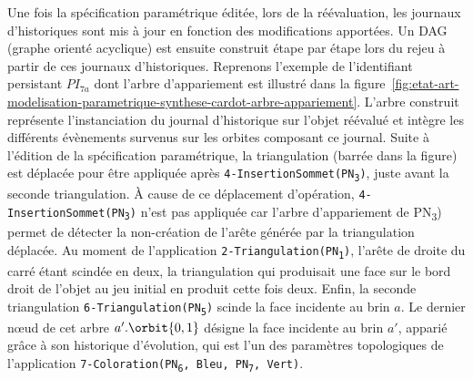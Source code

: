Une fois la spécification paramétrique éditée, lors de la réévaluation, les journaux d'historiques sont mis à jour en fonction des modifications apportées. Un DAG
(graphe orienté acyclique) est ensuite construit étape par étape lors du rejeu à partir de ces journaux d'historiques. %
Reprenons l'exemple de l'identifiant persistant \(PI_{7a}\) dont l'arbre d'appariement est illustré dans la
figure~\ref{fig:etat-art-modelisation-parametrique-synthese-cardot-arbre-appariement}. %
L'arbre construit représente l'instanciation du journal d'historique sur l'objet réévalué et intègre les différents évènements survenus sur les orbites composant ce journal.
Suite à l'édition de la spécification paramétrique, la triangulation (barrée dans la figure) est déplacée pour être appliquée après \texttt{4-InsertionSommet(PN\textsubscript{3})}, juste avant la seconde triangulation. %
À cause de ce déplacement d'opération, \texttt{4-InsertionSommet(PN\textsubscript{3})} n'est pas appliquée car l'arbre d'appariement de PN\textsubscript{3}) permet de détecter la non-création de l'arête générée par la triangulation déplacée. %
Au moment de l'application \texttt{2-Triangulation(PN\textsubscript{1})}, l'arête de droite du carré étant scindée en deux, la triangulation qui produisait une face sur le bord droit de l'objet au jeu initial en produit cette fois deux. %
Enfin, la seconde triangulation \texttt{6-Triangulation(PN\textsubscript{5})} scinde la face incidente au brin \(a\). %
Le dernier n\oe ud de cet arbre \(a'.\orbit{0,1}\) désigne la face incidente au brin \(a'\), apparié grâce à son historique d'évolution, qui est l'un des paramètres topologiques de l'application \texttt{7-Coloration(PN\textsubscript{6}, Bleu, PN\textsubscript{7}, Vert)}. %

